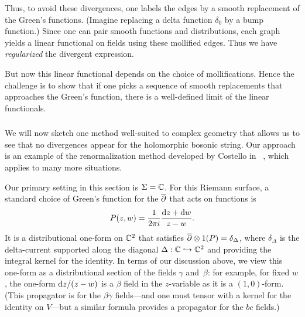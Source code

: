 Thus, to avoid these divergences, one labels the edges by a smooth replacement of the Green's functions. 
(Imagine replacing a delta function $\delta_0$ by a bump function.)
Since one can pair smooth functions and distributions,
each graph yields a linear functional on fields using these mollified edges.
Thus we have {\em regularized} the divergent expression.

But now this linear functional depends on the choice of mollifications.
Hence the challenge is to show that 
if one picks a sequence of smooth replacements that approaches the Green's function,
there is a well-defined limit of the linear functionals.

\subsubsection{}

We will now sketch one method well-suited to complex geometry
that allows us to see that no divergences appear for the holomorphic bosonic string.
Our approach is an example of the renormalization method developed by Costello in ~\cite{CosBook},
which applies to many more situations.

Our primary setting in this section is $\Sigma=\mathbb C$.
For this Riemann surface, 
a standard choice of Green's function for the $\overline{\partial}$ that acts on functions is
\[
P(z,w) = \frac{1}{2 \pi i} \frac{{\rm d} z + {\rm d} w}{z-w}.
\]
It is a distributional one-form on $\mathbb C^2$ that satisfies $\overline{\partial} \otimes 1(P) = \delta_\Delta$, 
where $\delta_\Delta$ is the delta-current supported along the diagonal $\Delta: \mathbb C \hookrightarrow \mathbb C^2$ and providing the integral kernel for the identity.
In terms of our discussion above,
we view this one-form as a distributional section of the fields $\gamma$ and~$\beta$: 
for example, for fixed $w$, the one-form ${\rm d} z/(z - w)$ is a $\beta$ field in the $z$-variable 
as it is a $(1,0)$-form.
(This propagator is for the $\beta\gamma$ fields---and one must tensor with a kernel for the identity on $V$---but a similar formula provides a propagator for the $bc$ fields.)

\subsubsection{}

